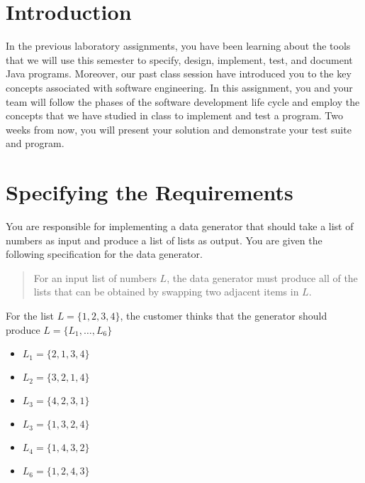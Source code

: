 

\usepackage[compact]{titlesec}



\section*{Introduction}

In the previous laboratory assignments, you have been learning about the tools that we will use this semester to
specify, design, implement, test, and document Java programs. Moreover, our past class session have introduced you to
the key concepts associated with software engineering.  In this assignment, you and your team will follow the phases of
the software development life cycle and employ the concepts that we have studied in class  to implement and test a
program. Two weeks from now, you will present your solution and demonstrate your test suite and program.

\section*{Specifying the Requirements}

You are responsible for implementing a data generator that should take a list of numbers as input and produce a list of
lists as output.  You are given the following specification for the data generator.

\begin{quote}
For an input list of numbers $L$, the data generator must produce all of the lists that can be obtained by swapping two
adjacent items in $L$.
\end{quote} 	

\noindent
For the list $L = \{1, 2, 3, 4\}$, the customer thinks that the generator should produce $L=\{L_1, \ldots, L_6\}$ 

\begin{itemize}
	\item[] $L_1 = \{2, 1, 3, 4\}$
	\item[] $L_2 = \{3, 2, 1, 4\}$
	\item[] $L_3 = \{4, 2, 3, 1\}$
	\item[] $L_3 = \{1, 3, 2, 4\}$
	\item[] $L_4 = \{1, 4, 3, 2\}$
	\item[] $L_6 = \{1, 2, 4, 3\}$
\end{itemize} 

